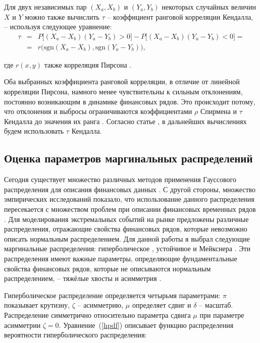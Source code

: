 Для двух независимых пар $(X_a, X_b)$ и $(Y_a, Y_b)$ некоторых случайных величин $X$ и $Y$ можно также вычислить $\tau$ -- коэффициент ранговой корреляции Кендалла, -- используя следующее уравнение:
%
\begin{eqnarray}\label{kendall}
\tau &=& P\big[(X_a-X_b)(Y_a-Y_b)>0\big]-P\big[(X_a-X_b)(Y_a-Y_b)<0\big] = \\ 
&=& r\big(\text{sgn}(X_a-X_b),\text{sgn}(Y_a-Y_b)\big),\nonumber
\end{eqnarray}

\noindent где $r(x,y)$ также корреляция Пирсона \cite{Kendall1970}.

Оба выбранных коэффициента ранговой корреляции, в отличие от линейной корреляции Пирсона, намного менее чувствительны к сильным отклонениям, постоянно возникающим в динамике финансовых рядов.
Это происходит потому, что отклонения и выбросы ограничиваются коэффициентами $\rho$ Спирмена и $\tau$ Кендалла до значения их ранга \cite{Ane2003}.
Согласно статье \cite{Dissmann2013}, в дальнейших вычислениях будем использовать $\tau$ Кендалла.

\subsection{Оценка параметров маргинальных распределений}
\label{methodology:marginals}

Сегодня существует множество различных методов применения Гауссового распределения для описания финансовых данных \cite{Json1949}. 
С другой стороны, множество эмпирических исследований показало, что использование данного распределения пересекается с множеством проблем при описании финансовых временных рядов \cite{Limp2011, Rachev2005, Wilmott2007}. 
Для моделирования экстремальных событий на рынке предложены различные распределения, отражающие свойства финансовых рядов, которые невозможно описать нормальным распределением.
Для данной работы я выбрал следующие маргинальные распределения: гиперболическое \cite{Barndoff1983}, устойчивое \cite{Nolan2009, Rachev2005, Stoyanov2013} и Мейкснера \cite{Schoutens2002}. Эти распределения имеют важные параметры, определяющие фундаментальные свойства финансовых рядов, которые не описываются нормальным распределением, -- тяжёлые хвосты и асимметрия \cite{Stoyanov2013}. 

Гиперболическое распределение определяется четырьмя параметрами: $\pi$ показывает крутизну, $\zeta$ -- асимметрию, $\mu$ определяет сдвиг и $\delta$ -- масштаб. 
Распределение симметрично относительно параметра сдвига $\mu$ при параметре асимметрии $\zeta=0$. 
Уравнение~(\ref{hpdf}) описывает функцию распределения вероятности гиперболического распределения:

